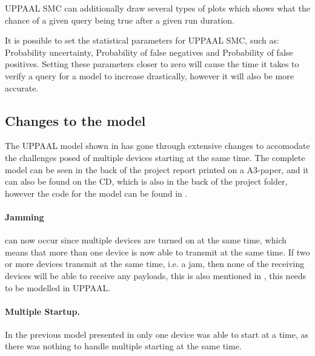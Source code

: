 UPPAAL SMC can additionally draw several types of plots which shows what the chance of a given query being true after a given run duration.

It is possible to set the statistical parameters for UPPAAL SMC, such as: Probability uncertainty, Probability of false negatives and Probability of false positives. 
Setting these parameters closer to zero will cause the time it takes to verify a query for a model to increase drastically, however it will also be more accurate. 


\subsection*{Changes to the model}

The UPPAAL model shown in  has gone through extensive changes to accomodate the challenges posed of multiple devices starting at the same time.
The complete model can be seen in the back of the project report printed on a A3-paper, and it can also be found on the CD, which is also in the back of the project folder, however the code for the model can be found in .


\paragraph{Jamming} can now occur since multiple devices are turned on at the same time, which means that more than one device is now able to transmit at the same time.
If two or more devices transmit at the same time, i.e. a jam, then none of the receiving devices will be able to receive any payloads, this is also mentioned in , this needs to be modelled in UPPAAL. 

\paragraph{Multiple Startup.}
In the previous model presented in  only one device was able to start at a time, as there was nothing to handle multiple starting at the same time.

